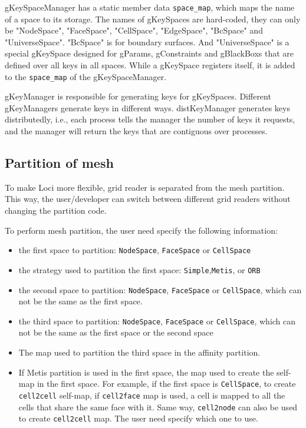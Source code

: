\documentclass{article}
\begin{document}
gKeySpaceManager has a static member data \texttt{space\_map}, which maps the
name of a space to its storage. The names of gKeySpaces are hard-coded,
they can only be "NodeSpace", "FaceSpace", "CellSpace", "EdgeSpace", "BcSpace" and "UniverseSpace".
"BcSpace" is for boundary surfaces. And "UniverseSpace" is a special gKeySpace designed for
gParams, gConstraints and gBlackBoxs that are defined over all keys in all spaces.
While a gKeySpace registers itself, it is added to the \texttt{space\_map} of
the gKeySpaceManager.


gKeyManager is responsible for generating keys for
gKeySpaces. Different gKeyManagers generate keys in different
ways. distKeyManager generates keys distributedly, i.e., each process
tells the manager the number of keys it requests, and the manager
will return the keys that are contiguous over processes. 

\subsection{Partition of mesh }
To make Loci more flexible, grid reader is separated from the mesh
partition. This way, the user/developer can switch between different
grid readers without changing the partition code. 


To perform mesh partition, the user need specify the following
information:
\begin{itemize}
\item the first space to partition: \texttt{NodeSpace}, \texttt{FaceSpace} or \texttt{CellSpace} 
\item the strategy used to partition the first space:
  \texttt{Simple},\texttt{Metis}, or \texttt{ORB}
\item the second space to partition: \texttt{NodeSpace},
  \texttt{FaceSpace} or \texttt{CellSpace}, which can not be the same
  as the first space.
\item the third space to partition: \texttt{NodeSpace},
  \texttt{FaceSpace} or \texttt{CellSpace}, which can not be the same
  as the first space or the second space
\item The map used to partition the third space in the affinity
  partition. 
\item If Metis partition is used in the first space, the map used
  to create the self-map in the first space. 
  For example, if the first space is \texttt{CellSpace}, to create \texttt{cell2cell} self-map, if
  \texttt{cell2face} map is used, a cell is mapped to all the cells
  that share the same face with it. Same way, 
  \texttt{cell2node} can also be used to create \texttt{cell2cell} map. The
  user need specify which one to use.  
\end{itemize} 
\end{document}
